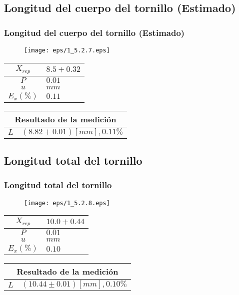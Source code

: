 \documentclass[letter,11pt]{beamer}
\begin{document}
\subsection{Longitud del cuerpo del tornillo (Estimado)}
\begin{frame}
\frametitle{Longitud del cuerpo del tornillo (Estimado)}
\vspace*{0.8cm}
\begin{figure}
\centering
\texttt{[image: eps/1\_5.2.7.eps]}
\end{figure}
\vspace*{0.4cm}
\scriptsize
\begin{tabular}{|c|>{\centering}m{1.8cm}<{\centering}|}
\hline
$X_{rep}$ &  $8.5+0.32$ \tabularnewline \hline
      $P$ &      $0.01$ \tabularnewline \hline
      $u$ &        $mm$ \tabularnewline \hline
$E_x(\%)$ &      $0.11$ \tabularnewline \hline
\end{tabular}
\quad
\begin{tabular}{|c|>{\centering}m{5.7cm}<{\centering}|}
\hline
\multicolumn{2}{|c|}{\textbf{Resultado de la medición}} \\ \hline
$L$ & $( 8.82\pm0.01)[mm], 0.11\%$ \tabularnewline \hline
\end{tabular}
\end{frame}

\subsection{Longitud total del tornillo}
\begin{frame}
\frametitle{Longitud total del tornillo}
\vspace*{0.8cm}
\begin{figure}
\centering
\texttt{[image: eps/1\_5.2.8.eps]}
\end{figure}
\vspace*{0.4cm}
\scriptsize
\begin{tabular}{|c|>{\centering}m{1.8cm}<{\centering}|}
\hline
$X_{rep}$ &  $10.0+0.44$ \tabularnewline \hline
      $P$ &       $0.01$ \tabularnewline \hline
      $u$ &         $mm$ \tabularnewline \hline
$E_x(\%)$ &       $0.10$ \tabularnewline \hline
\end{tabular}
\quad
\begin{tabular}{|c|>{\centering}m{5.7cm}<{\centering}|}
\hline
\multicolumn{2}{|c|}{\textbf{Resultado de la medición}} \\ \hline
$L$ & $(10.44\pm0.01)[mm], 0.10\%$ \tabularnewline \hline
\end{tabular}
\end{frame}
\end{document}
